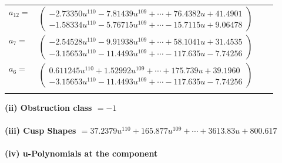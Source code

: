 \documentclass[1p]{elsarticle_modified}
\theoremstyle{definition}
\begin{document}
\begin{tabular}{m{7pt} m{180pt} m{7pt} m{180pt} }
\flushright $a_{12}=$&$\begin{pmatrix}-2.73350 u^{110}-7.81439 u^{109}+\cdots+76.4382 u+41.4901\\-1.58334 u^{110}-5.76715 u^{109}+\cdots-15.7115 u+9.06478\end{pmatrix}$ \\
\flushright $a_{7}=$&$\begin{pmatrix}-2.54528 u^{110}-9.91938 u^{109}+\cdots+58.1041 u+31.4535\\-3.15653 u^{110}-11.4493 u^{109}+\cdots-117.635 u-7.74256\end{pmatrix}$ \\
\flushright $a_{6}=$&$\begin{pmatrix}0.611245 u^{110}+1.52992 u^{109}+\cdots+175.739 u+39.1960\\-3.15653 u^{110}-11.4493 u^{109}+\cdots-117.635 u-7.74256\end{pmatrix}$\\&\end{tabular}
\flushleft \textbf{(ii) Obstruction class $= -1$}\\~\\
\flushleft \textbf{(iii) Cusp Shapes $= 37.2379 u^{110}+165.877 u^{109}+\cdots+3613.83 u+800.617$}\\~\\
\newpage\renewcommand{\arraystretch}{1}
\flushleft \textbf{(iv) u-Polynomials at the component}\newline \\
\end{document}
